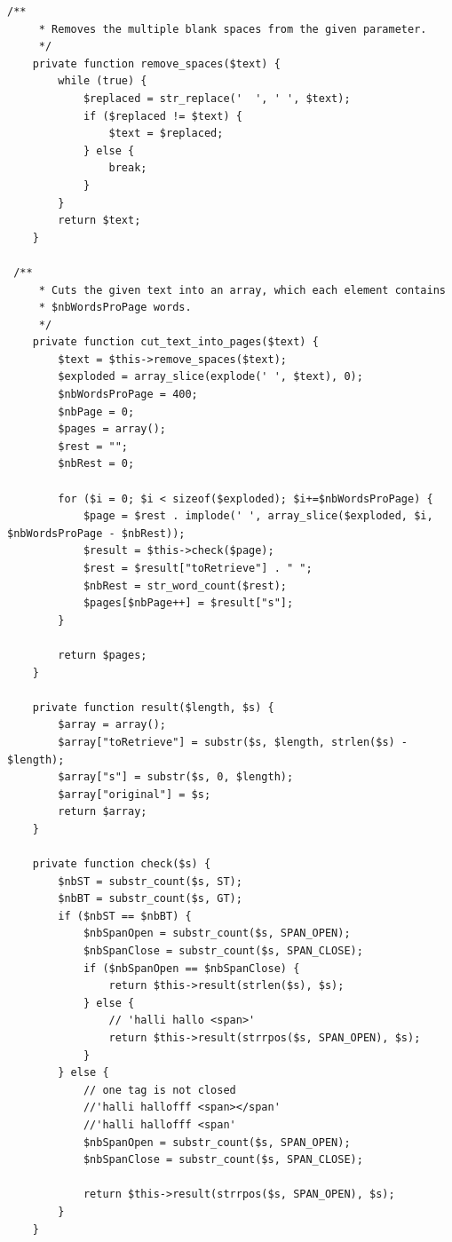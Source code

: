 \begin{lstlisting}[caption=Workaround for the \textit{html2pdf} pagebreak problem]
   /**
     * Removes the multiple blank spaces from the given parameter.
     */
    private function remove_spaces($text) {
        while (true) {
            $replaced = str_replace('  ', ' ', $text);
            if ($replaced != $text) {
                $text = $replaced;
            } else {
                break;
            }
        }
        return $text;
    }

 /**
     * Cuts the given text into an array, which each element contains
     * $nbWordsProPage words.
     */
    private function cut_text_into_pages($text) {
        $text = $this->remove_spaces($text);
        $exploded = array_slice(explode(' ', $text), 0);
        $nbWordsProPage = 400;
        $nbPage = 0;
        $pages = array();
        $rest = "";
        $nbRest = 0;

        for ($i = 0; $i < sizeof($exploded); $i+=$nbWordsProPage) {
            $page = $rest . implode(' ', array_slice($exploded, $i, $nbWordsProPage - $nbRest));
            $result = $this->check($page);
            $rest = $result["toRetrieve"] . " ";
            $nbRest = str_word_count($rest);
            $pages[$nbPage++] = $result["s"];
        }

        return $pages;
    }

    private function result($length, $s) {
        $array = array();
        $array["toRetrieve"] = substr($s, $length, strlen($s) - $length);
        $array["s"] = substr($s, 0, $length);
        $array["original"] = $s;
        return $array;
    }

    private function check($s) {
        $nbST = substr_count($s, ST);
        $nbBT = substr_count($s, GT);
        if ($nbST == $nbBT) {
            $nbSpanOpen = substr_count($s, SPAN_OPEN);
            $nbSpanClose = substr_count($s, SPAN_CLOSE);
            if ($nbSpanOpen == $nbSpanClose) {
                return $this->result(strlen($s), $s);
            } else {
                // 'halli hallo <span>'
                return $this->result(strrpos($s, SPAN_OPEN), $s);
            }
        } else {
            // one tag is not closed
            //'halli hallofff <span></span'
            //'halli hallofff <span'
            $nbSpanOpen = substr_count($s, SPAN_OPEN);
            $nbSpanClose = substr_count($s, SPAN_CLOSE);

            return $this->result(strrpos($s, SPAN_OPEN), $s);
        }
    }
\end{lstlisting}

